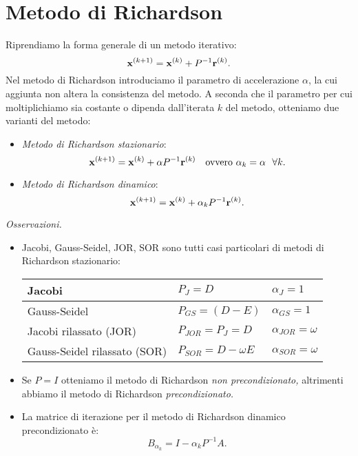 \section{Metodo di Richardson}
Riprendiamo la forma generale di un metodo iterativo:
\begin{equation*}
\mathbf{x}^{( k+1)} =\mathbf{x}^{(k)} +P^{-1}\mathbf{r}^{(k)}.
\end{equation*}
Nel metodo di Richardson introduciamo il parametro di accelerazione $\alpha $, la cui aggiunta non altera la consistenza del metodo.
A seconda che il parametro per cui moltiplichiamo sia costante o dipenda dall'iterata $k$ del metodo, otteniamo due varianti del metodo:
\begin{itemize}
\item \textit{Metodo di Richardson stazionario}:
\begin{equation*}
\x^{( k+1)} =\x^{(k)} +\alpha P^{-1}\mathbf{r}^{(k)} \quad \text{ovvero } \alpha _{k} =\alpha \ \ \forall k.
\end{equation*}
\item \textit{Metodo di Richardson dinamico}:
\begin{equation*}
\mathbf{x}^{( k+1)} =\mathbf{x}^{(k)} +\alpha _{k} P^{-1}\mathbf{r}^{(k)}.
\end{equation*}
\end{itemize}
\textit{Osservazioni.}
\begin{itemize}
\item Jacobi, Gauss-Seidel, JOR, SOR sono tutti casi particolari di metodi di Richardson stazionario:
\begin{table}[H]
  \centering
  \def\arraystretch{1.5}
  \begin{tabular}{|l|l|l|}
    \hline
    Jacobi                       & $P_{J} =D$& $\alpha_{J} =1$\\ \hline
    Gauss-Seidel                 & $P_{GS} =( D-E)$ & $\alpha_{GS}=1$ \\ \hline
    Jacobi rilassato (JOR)       & $P_{JOR}=P_J=D$ & $\alpha_{JOR}=\omega$ \\ \hline
    Gauss-Seidel rilassato (SOR) & $P_{SOR}=D-\omega E$ & $\alpha_{SOR}=\omega$ \\ \hline
  \end{tabular}
\end{table}
\item Se $P=I$ otteniamo il metodo di Richardson \textit{non precondizionato,} altrimenti abbiamo il metodo di Richardson \textit{precondizionato.}
\item La matrice di iterazione per il metodo di Richardson dinamico precondizionato è:
\begin{equation*}
B_{\alpha _{k}} =I-\alpha _{k} P^{-1} A.
\end{equation*}
\end{itemize}

